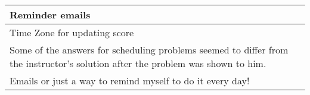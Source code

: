 \begin{longtable}{|p{1\linewidth}|}
		\hline
		Reminder emails                                                                                                                                                                                                                                                                                                                                                                                                                                                                                                                                                                                                                                                                                  \\
		\hline
		Time Zone for updating score                                                                                                                                                                                                                                                                                                                                                                                                                                                                                                                                                                                                                                                                     \\
		\hline
		Some of the answers for scheduling problems seemed to differ from the instructor's solution after the problem was shown to him.                                                                                                                                                                                                                                                                                                                                                                                                                                                                                                                                                                  \\
		\hline
		Emails or just a way to remind myself to do it every day!                                                                                                                                                                                                                                                                                                                                                                                                                                                                                                                                                                                                                                        \\

\end{longtable}
